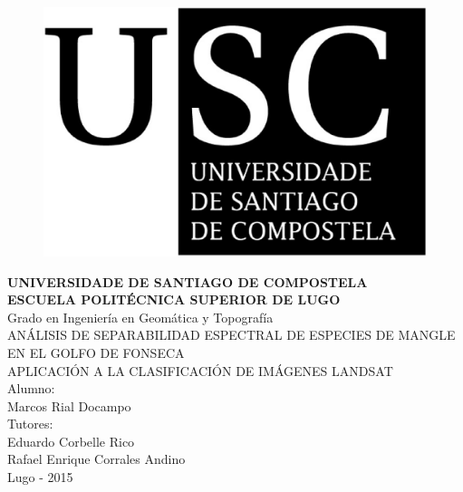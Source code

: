 




\begin{figure}[t]
\centering
\includegraphics[scale=0.2]{./Imagenes/USCbn.eps} %
\end{figure}

\begin{center}
\textbf{{\Huge UNIVERSIDADE DE SANTIAGO DE COMPOSTELA}\\[1cm]
{\LARGE ESCUELA POLITÉCNICA SUPERIOR DE LUGO}}\\[2cm]
{\Large Grado en Ingeniería en Geomática y Topografía}\\[3cm]
{\Large ANÁLISIS DE SEPARABILIDAD ESPECTRAL DE ESPECIES DE MANGLE EN EL GOLFO DE FONSECA}\\
{\Large APLICACIÓN A LA CLASIFICACIÓN DE IMÁGENES LANDSAT}\\[2cm]
{\normalsize \vfill{Alumno:\\Marcos Rial Docampo\\Tutores:\\Eduardo Corbelle Rico\\Rafael Enrique Corrales Andino}}\\
{\footnotesize \vfill{Lugo - 2015%
}}
\end{center}